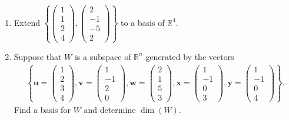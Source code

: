\documentclass[a4paper,11pt]{article}
\begin{document}
\begin{enumerate}[label=5.\arabic*]
    \item Extend $\left\{ \begin{pmatrix} 1 \\ 1 \\ 2 \\ 4 \end{pmatrix}, \begin{pmatrix} 2 \\ -1 \\ -5 \\ 2 \end{pmatrix} \right\}$ to a basis of $\mathbb{R}^4$.
    
    \item Suppose that $W$ is a subspace of $\mathbb{R}^n$ generated by the vectors
    \begin{align*}
        \left\{ \mathbf{u} = \begin{pmatrix} 1 \\ 2 \\ 3 \\ 4 \end{pmatrix}, 
        \mathbf{v} = \begin{pmatrix} 1 \\ -1 \\ 2 \\ 0 \end{pmatrix}, 
        \mathbf{w} = \begin{pmatrix} 2 \\ 1 \\ 5 \\ 3 \end{pmatrix}, 
        \mathbf{x} = \begin{pmatrix} 1 \\ -1 \\ 0 \\ 3 \end{pmatrix}, 
        \mathbf{y} = \begin{pmatrix} 1 \\ -1 \\ 0 \\ 4 \end{pmatrix} \right\}.
    \end{align*}
    Find a basis for $W$ and determine $\dim(W)$.
\end{enumerate}
\end{document}
